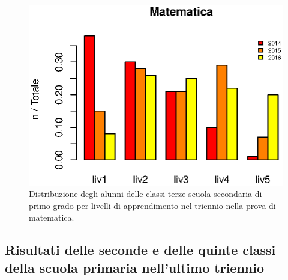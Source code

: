 \documentclass[12pt,a4paper,oneside]{memoir}
\begin{document}
\clearpage

\begin{figure}[htp]
\centering
\caption{Distribuzione degli alunni delle classi terze scuola secondaria di primo grado per livelli di apprendimento nel triennio nella prova di matematica.}
\label{fig:distr-matematica-iii}
\includegraphics[width=0.8\linewidth]{matematica}
\end{figure}

\subsection[Seconde e quinte della scuola primaria]{Risultati delle seconde e delle quinte classi della scuola primaria nell'ultimo triennio}
\end{document}
